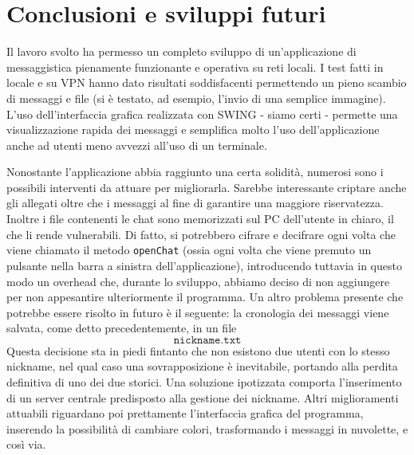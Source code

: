 \section{Conclusioni e sviluppi futuri}
Il lavoro svolto ha permesso un completo sviluppo di un'applicazione di
messaggistica pienamente funzionante e operativa su reti locali. I test
fatti in locale e su VPN hanno dato risultati soddisfacenti permettendo un
pieno scambio di messaggi e file (si è testato, ad esempio, l'invio di
una semplice immagine). L'uso dell'interfaccia grafica realizzata con
SWING - siamo certi - permette una visualizzazione rapida dei messaggi
e semplifica molto l'uso dell'applicazione anche ad
utenti meno avvezzi all'uso di un terminale.

Nonostante l'applicazione abbia raggiunto una certa solidità,
numerosi sono i possibili interventi da attuare per migliorarla.
Sarebbe interessante criptare anche gli allegati oltre che i
messaggi al fine di garantire una maggiore riservatezza.
Inoltre i file contenenti le chat sono memorizzati sul PC
dell'utente in chiaro, il che li rende vulnerabili.
Di fatto, si potrebbero cifrare e decifrare ogni volta che viene chiamato
il metodo \texttt{openChat} (ossia ogni volta che viene premuto
un pulsante nella barra a sinistra dell'applicazione), introducendo
tuttavia in questo modo un overhead che, durante lo sviluppo, abbiamo
deciso di non aggiungere per non appesantire ulteriormente il programma.
Un altro problema presente che potrebbe essere risolto in futuro è il seguente:
la cronologia dei messaggi viene salvata, come detto precedentemente, in un
file
$$ \texttt{nickname.txt} $$
Questa decisione sta in piedi fintanto che non esistono due utenti con lo stesso nickname,
nel qual caso una sovrapposizione è inevitabile, portando alla perdita definitiva
di uno dei due storici. Una soluzione ipotizzata comporta l'inserimento di
un server centrale predisposto alla gestione dei nickname.
Altri miglioramenti attuabili riguardano poi prettamente l'interfaccia
grafica del programma, inserendo la possibilità di cambiare colori,
trasformando i messaggi in nuvolette, e così via.